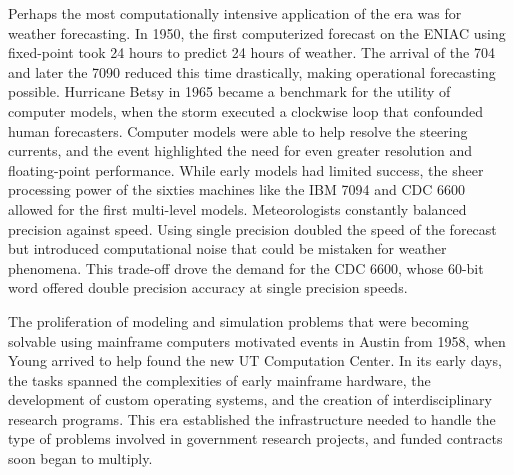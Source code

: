 Perhaps the most computationally intensive application of the era was for weather forecasting. In 1950, the first computerized forecast on the ENIAC using fixed-point took 24 hours to predict 24 hours of weather. The arrival of the 704 and later the 7090 reduced this time drastically, making operational forecasting possible. Hurricane Betsy in 1965 became a benchmark for the utility of computer models, when the storm executed a clockwise loop that confounded human forecasters. Computer models were able to help resolve the steering currents, and the event highlighted the need for even greater resolution and floating-point performance. While early models had limited success, the sheer processing power of the sixties machines like the IBM 7094 and CDC 6600 allowed for the first multi-level models. Meteorologists constantly balanced precision against speed. Using single precision doubled the speed of the forecast but introduced computational noise that could be mistaken for weather phenomena. This trade-off drove the demand for the CDC 6600, whose 60-bit word offered double precision accuracy at single precision speeds. 

The proliferation of modeling and simulation problems that were becoming solvable using mainframe computers motivated events in Austin from 1958, when Young arrived to help found the new UT Computation Center. In its early days, the tasks spanned the complexities of early mainframe hardware, the development of custom operating systems, and the creation of interdisciplinary research programs. This era established the infrastructure needed to handle the type of problems involved in government research projects, and funded contracts soon began to multiply. 
